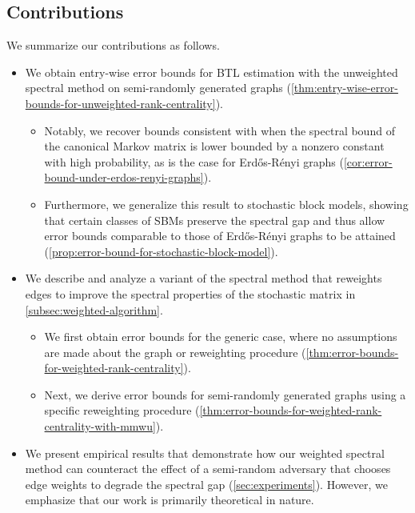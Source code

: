 \documentclass[sigconf,nonacm,pbalance]{acmart}
\begin{document}
\subsection{Contributions}
We summarize our contributions as follows.
\begin{itemize}[leftmargin=*]
    \item We obtain entry-wise error bounds for BTL estimation with the unweighted spectral method on semi-randomly generated graphs (\cref{thm:entry-wise-error-bounds-for-unweighted-rank-centrality}).
    \begin{itemize}
        \item Notably, we recover bounds consistent with \cite{Chenetal2019} when the spectral bound of the canonical Markov matrix is lower bounded by a nonzero constant with high probability, as is the case for Erd\H{o}s-R\'{e}nyi graphs (\cref{cor:error-bound-under-erdos-renyi-graphs}).
        \item Furthermore, we generalize this result to stochastic block models, showing that certain classes of SBMs preserve the spectral gap and thus allow error bounds comparable to those of Erd\H{o}s-R\'{e}nyi graphs to be attained (\cref{prop:error-bound-for-stochastic-block-model}).
    \end{itemize}
    \item We describe and analyze a variant of the spectral method that reweights edges to improve the spectral properties of the stochastic matrix in \cref{subsec:weighted-algorithm}.
    \begin{itemize}
        \item We first obtain error bounds for the generic case, where no assumptions are made about the graph or reweighting procedure (\cref{thm:error-bounds-for-weighted-rank-centrality}).
        \item Next, we derive error bounds for semi-randomly generated graphs using a specific reweighting procedure 
        (\cref{thm:error-bounds-for-weighted-rank-centrality-with-mmwu}).
    \end{itemize}
    \item We present empirical results that demonstrate how our weighted spectral method can counteract the effect of a semi-random adversary that chooses edge weights to degrade the spectral gap (\cref{sec:experiments}). However, we emphasize that our work is primarily theoretical in nature.
\end{itemize}
\end{document}
